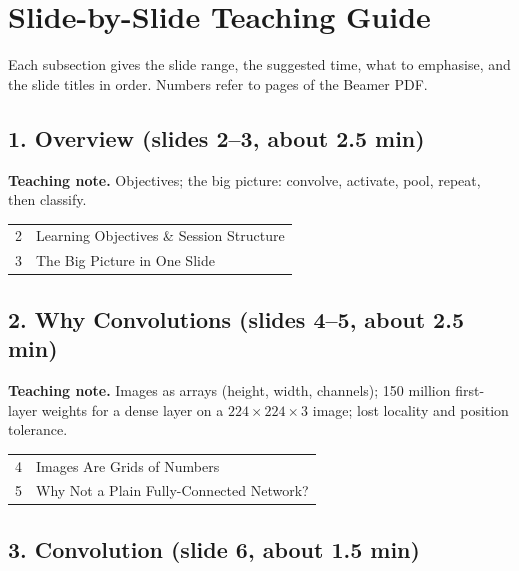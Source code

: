 \documentclass[11pt]{article}
\begin{document}
\section{Slide-by-Slide Teaching Guide}

Each subsection gives the slide range, the suggested time, what to emphasise, and the slide titles in order. Numbers refer to pages of the Beamer PDF.

\subsection{1. Overview \normalfont\small\color{GreyN}(slides 2--3, about 2.5 min)}

\textbf{Teaching note.} Objectives; the big picture: convolve, activate, pool, repeat, then classify.

\begin{center}\small\renewcommand{\arraystretch}{1.1}\begin{tabularx}{\textwidth}{@{}r X@{}}2 & Learning Objectives \& Session Structure\\
3 & The Big Picture in One Slide\\\end{tabularx}\end{center}

\subsection{2. Why Convolutions \normalfont\small\color{GreyN}(slides 4--5, about 2.5 min)}

\textbf{Teaching note.} Images as arrays (height, width, channels); 150 million first-layer weights for a dense layer on a $224\times224\times3$ image; lost locality and position tolerance.

\begin{center}\small\renewcommand{\arraystretch}{1.1}\begin{tabularx}{\textwidth}{@{}r X@{}}4 & Images Are Grids of Numbers\\
5 & Why Not a Plain Fully-Connected Network?\\\end{tabularx}\end{center}

\subsection{3. Convolution \normalfont\small\color{GreyN}(slide 6, about 1.5 min)}
\end{document}
